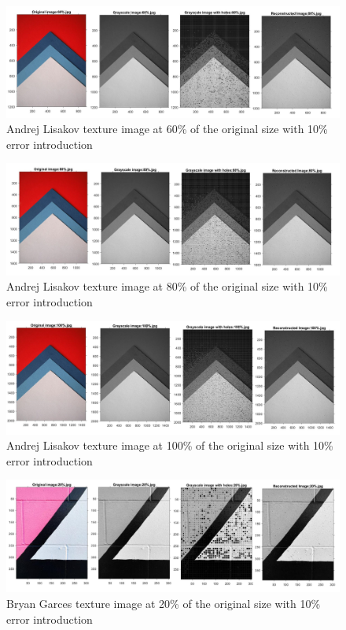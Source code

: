 \begin{figure}[!ht]
\center \includegraphics[scale=0.31]{AndrejLisakov60.jpg}
\caption{Andrej Lisakov texture image at 60\% of the original size with 10\% error introduction}
\label{fig:AndrejLisakov60}
\end{figure}

\begin{figure}[!ht]
\center \includegraphics[scale=0.31]{AndrejLisakov80.jpg}
\caption{Andrej Lisakov texture image at 80\% of the original size with 10\% error introduction}
\label{fig:AndrejLisakov80}
\end{figure}

\begin{figure}[!ht]
\center \includegraphics[scale=0.31]{AndrejLisakov100.jpg}
\caption{Andrej Lisakov texture image at 100\% of the original size with 10\% error introduction}
\label{fig:AndrejLisakov100}
\end{figure}


\begin{figure}[!ht]
\center \includegraphics[scale=0.31]{BryanGarces20.jpg}
\caption{Bryan Garces texture image at 20\% of the original size with 10\% error introduction}
\label{fig:BryanGarces20}
\end{figure}

